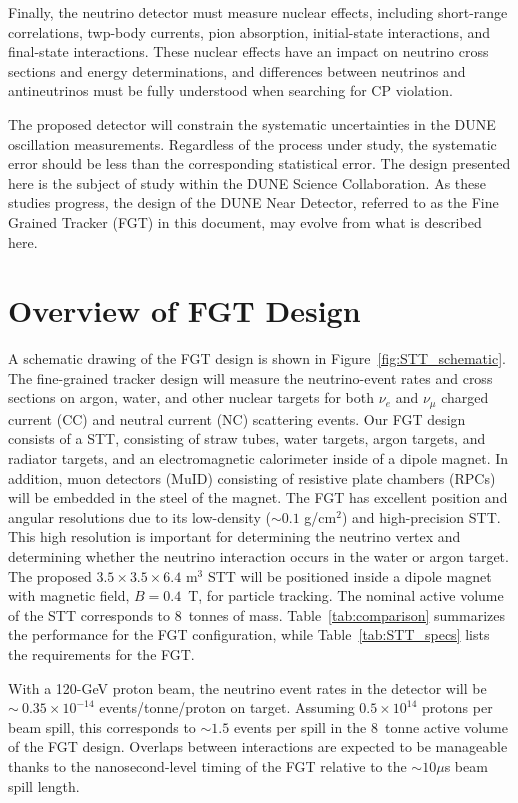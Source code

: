 Finally, the neutrino detector must measure nuclear effects, including
short-range correlations, twp-body currents, pion absorption, initial-state interactions, 
and final-state interactions. These nuclear effects 
have an impact on neutrino cross sections and energy determinations, and differences
between neutrinos and antineutrinos must be fully understood when searching
for CP violation.

The proposed detector will constrain the systematic uncertainties in the DUNE 
oscillation measurements. Regardless of the process under study, the 
systematic error should be less than the corresponding statistical error. 
The design presented here is the subject of study within the DUNE Science 
Collaboration. As these studies 
progress, the design of the DUNE Near Detector, 
referred to as the Fine Grained Tracker (FGT) in this document, may 
evolve from what is described here. 

\section{Overview of FGT Design}

A schematic drawing of the 
FGT design is shown in Figure~\ref{fig:STT_schematic}. 
The fine-grained tracker 
design will measure the neutrino-event rates and cross sections 
on argon, water, and other nuclear 
targets for both $\nu_e$ and $\nu_\mu$ charged current (CC) and
neutral current (NC) scattering events. Our FGT design 
consists of a STT, consisting of straw tubes, water targets, argon targets, 
and radiator targets, and an electromagnetic calorimeter inside of a
dipole magnet. In addition, muon detectors (MuID) consisting of resistive plate
chambers (RPCs) will be embedded in the steel
of the magnet. The FGT has excellent position and angular resolutions due to
its low-density ($\sim 0.1$ g/cm$^2$) and high-precision STT. This high 
resolution is important for determining the neutrino
vertex and determining whether the neutrino interaction occurs in the water
or argon target.  The
proposed $3.5\times3.5\times6.4$ m$^3$ STT will be positioned inside a 
dipole magnet with magnetic field, $B = 0.4$~T, for particle tracking.
The nominal active volume of the STT corresponds to 8~tonnes of mass.
Table~\ref{tab:comparison} summarizes the
performance for the FGT configuration, while
Table~\ref{tab:STT_specs} lists the requirements for the FGT.

With a 120-GeV proton beam, the neutrino event rates in the detector
will be $\sim~0.35\times 10^{-14}$ events/tonne/proton on target.
Assuming $0.5\times 10^{14}$ protons per beam spill, this corresponds
to $\sim 1.5$ events per spill in the 8~tonne active volume of the FGT
design.  Overlaps between interactions are expected to be
manageable thanks to the nanosecond-level timing of the FGT relative to
the $\sim 10 \mu$s beam spill length.

